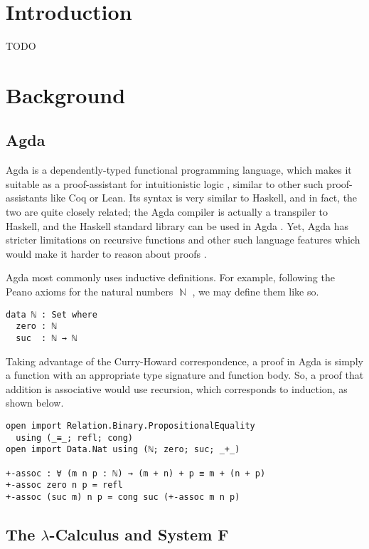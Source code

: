 \documentclass[logo,bsc,singlespacing,parskip,online]{infthesis}
\DeclareMathOperator{\nat}{\mathbb{N}}
\begin{document}
\chapter{Introduction}

TODO

\chapter{Background}

\section{Agda}
Agda is a dependently-typed functional programming language, which makes it suitable as a proof-assistant for intuitionistic logic \citep{norell_towards_2007}, similar to other such proof-assistants like Coq or Lean. Its syntax is very similar to Haskell, and in fact, the two are quite closely related; the Agda compiler is actually a transpiler to Haskell, and the Haskell standard library can be used in Agda \citep{kusee_compiling_2017}. Yet, Agda has stricter limitations on recursive functions and other such language features which would make it harder to reason about proofs \citep{berghofer_brief_2009}.

Agda most commonly uses inductive definitions. For example, following the Peano axioms for the natural numbers $\nat$ \citep{boolos_freges_1995}, we may define them like so.

\begin{verbatim}
data ℕ : Set where
  zero : ℕ
  suc  : ℕ → ℕ
\end{verbatim}

Taking advantage of the Curry-Howard correspondence, a proof in Agda is simply a function with an appropriate type signature and function body. So, a proof that addition is associative would use recursion, which corresponds to induction, as shown below.

\begin{verbatim}
open import Relation.Binary.PropositionalEquality
  using (_≡_; refl; cong)
open import Data.Nat using (ℕ; zero; suc; _+_)

+-assoc : ∀ (m n p : ℕ) → (m + n) + p ≡ m + (n + p)
+-assoc zero n p = refl
+-assoc (suc m) n p = cong suc (+-assoc m n p)
\end{verbatim}

\section{The $\lambda$-Calculus and System F}
\end{document}
